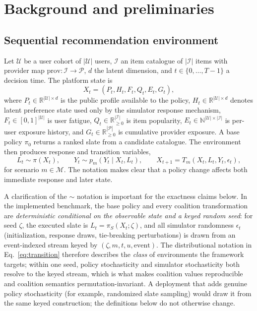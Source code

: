\documentclass[review]{elsarticle}
\theoremstyle{plain}
\theoremstyle{definition}
\theoremstyle{remark}
\newcommand{\Models}{\mathcal{M}}
\newcommand{\Policy}{\pi}
\newcommand{\BasePolicy}{\pi_0}
\begin{document}
\section{Background and preliminaries}\label{sec:background}

\subsection{Sequential recommendation environment}

Let $\mathcal{U}$ be a user cohort of $|\mathcal{U}|$ users, $\mathcal{I}$ an item catalogue of $|\mathcal{I}|$ items with provider map $\mathrm{prov}:\mathcal{I}\to\mathcal{P}$, $d$ the latent dimension, and $t\in\{0,\ldots,T-1\}$ a decision time. The platform state is
\begin{equation}
 X_t=(P_t,H_t,F_t,Q_t,E_t,G_t),
\label{eq:state}
\end{equation}
where $P_t\in\mathbb{R}^{|\mathcal{U}|\times d}$ is the public profile available to the policy, $H_t\in\mathbb{R}^{|\mathcal{U}|\times d}$ denotes latent preference state used only by the simulator response mechanism, $F_t\in[0,1]^{|\mathcal{U}|}$ is user fatigue, $Q_t\in\mathbb{R}_{\geq0}^{|\mathcal{I}|}$ is item popularity, $E_t\in\mathbb{N}^{|\mathcal{U}|\times|\mathcal{I}|}$ is per-user exposure history, and $G_t\in\mathbb{R}_{\geq0}^{|\mathcal{P}|}$ is cumulative provider exposure. A base policy $\BasePolicy$ returns a ranked slate from a candidate catalogue. The environment then produces response and transition variables,
\begin{equation}
 L_t\sim \Policy(X_t),\qquad Y_t\sim p_m(Y_t\mid X_t,L_t),\qquad X_{t+1}=T_m(X_t,L_t,Y_t,\epsilon_t),
\label{eq:transition}
\end{equation}
for scenario $m\in\Models$. The notation makes clear that a policy change affects both immediate response and later state.

A clarification of the $\sim$ notation is important for the exactness claims below. In the implemented benchmark, the base policy and every coalition transformation are \emph{deterministic conditional on the observable state and a keyed random seed}: for seed $\zeta$, the executed slate is $L_t=\Policy_S(X_t;\zeta)$, and all simulator randomness $\epsilon_t$ (initialization, response draws, tie-breaking perturbations) is drawn from an event-indexed stream keyed by $(\zeta,m,t,u,\mathrm{event})$. The distributional notation in Eq.~\eqref{eq:transition} therefore describes the \emph{class} of environments the framework targets; within one seed, policy stochasticity and simulator stochasticity both resolve to the keyed stream, which is what makes coalition values reproducible and coalition semantics permutation-invariant. A deployment that adds genuine policy stochasticity (for example, randomized slate sampling) would draw it from the same keyed construction; the definitions below do not otherwise change.
\end{document}
